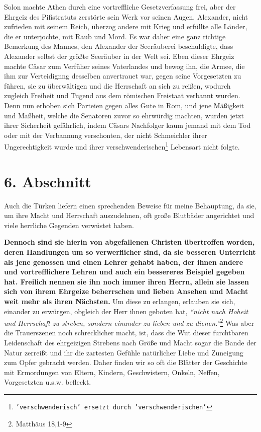 \medskip

Solon machte Athen durch eine
vortreffliche Gesetzverfassung frei, aber der
Ehrgeiz des Pifistratuts zerstörte sein Werk vor
seinen Augen. Alexander, nicht
zufrieden mit seinem Reich, überzog andere mit Krieg und erfüllte alle Länder,
die er unterjochte, mit Raub und Mord. Es war daher eine ganz richtige Bemerkung
des Mannes, den Alexander der Seeräuberei beschuldigte, dass Alexander selbst
der größte Seeräuber in der Welt sei. Eben dieser Ehrgeiz machte
Cäsar zum
Verfüher seines Vaterlandes und bewog ihn, die Armee, die ihm zur
Verteidignng desselben anvertrauet war, gegen seine Vorgesetzten zu führen, sie
zu überwältigen und die Herrschaft an sich zu reißen, wodurch zugleich Freiheit
und Tugend aus dem römischen Freistaat verbannt
wurden. Denn nun erhoben sich
Parteien gegen alles Gute in Rom, und jene Mäßigkeit und
Maßheit, welche die
Senatoren zuvor so ehrwürdig machten, wurden
jetzt ihrer Sicherheit gefährlich,
indem Cäsars Nachfolger kaum jemand mit dem Tod oder mit der Verbannung
verschonten, der nicht Schmeichler ihrer Ungerechtigkeit wurde und ihrer
verschwenderischen\footnote{\texttt{'verschwenderisch' ersetzt durch
'verschwenderischen'}} Lebensart nicht folgte.

\section{6. Abschnitt} \label{kap8_ab6}

Auch die Türken liefern einen sprechenden Beweise für
meine Behauptung, da sie,
um ihre Macht und Herrschaft auszudehnen, oft große Blutbäder angerichtet und
viele herrliche Gegenden verwüstet haben.

\medskip

\label{ref:08_06_heiden}\textbf{Dennoch sind sie hierin von abgefallenen
Christen übertroffen worden, deren
Handlungen um so verwerflicher sind, da sie besseren Unterricht als jene
genossen
und einen Lehrer gehabt haben, der ihnen andere und vortrefflichere Lehren und
auch ein bessereres Beispiel gegeben hat. Freilich nennen sie ihn noch immer
ihren
Herrn, allein sie lassen sich von ihrem Ehrgeize beherrschen und lieben Ansehen
und Macht weit mehr als ihren Nächsten.} Um diese zu
erlangen, erlauben sie sich,
einander zu erwürgen,  obgleich der Herr ihnen
geboten hat,
\textit{"`nicht nach Hoheit
und Herrschaft zu streben, sondern einander zu lieben und zu
dienen."'}\footnote{Matthäus 18,1-9}
Was aber die Trauerszenen noch schrecklicher
macht, ist, dass die Wut dieser furchtbaren Leidenschaft des ehrgeizigen
Strebens nach Größe und Macht sogar die Bande der Natur zerreißt und ihr die
zartesten Gefühle natürlicher Liebe und Zuneigung zum Opfer gebracht werden.
Daher finden wir so oft die Blätter der Geschichte mit Ermordungen von Eltern,
Kindern, Geschwistern, Onkeln, Neffen, Vorgesetzten u.s.w. befleckt.

